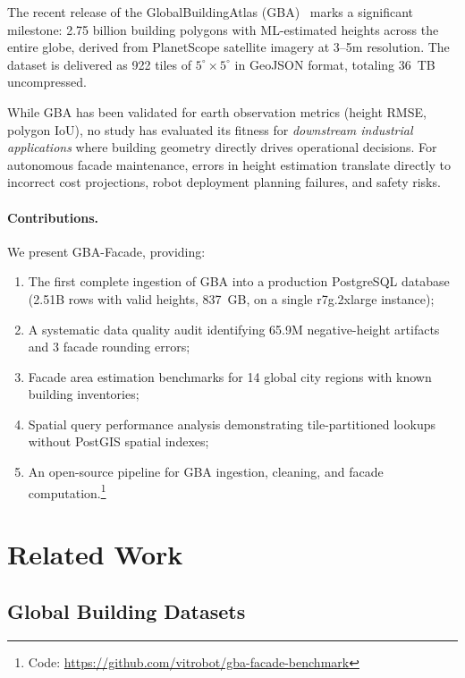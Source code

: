 \documentclass[10pt,twocolumn]{article}
\begin{document}
The recent release of the GlobalBuildingAtlas (GBA)~\citep{zhu2025gba} marks a significant milestone: 2.75 billion building polygons with ML-estimated heights across the entire globe, derived from PlanetScope satellite imagery at 3--5m resolution. The dataset is delivered as 922 tiles of $5^{\circ} \times 5^{\circ}$ in GeoJSON format, totaling 36~TB uncompressed.

While GBA has been validated for earth observation metrics (height RMSE, polygon IoU), no study has evaluated its fitness for \emph{downstream industrial applications} where building geometry directly drives operational decisions. For autonomous facade maintenance, errors in height estimation translate directly to incorrect cost projections, robot deployment planning failures, and safety risks.

\paragraph{Contributions.} We present GBA-Facade, providing:
\begin{enumerate}
  \item The first complete ingestion of GBA into a production PostgreSQL database (2.51B rows with valid heights, 837~GB, on a single r7g.2xlarge instance);
  \item A systematic data quality audit identifying 65.9M negative-height artifacts and 3 facade rounding errors;
  \item Facade area estimation benchmarks for 14 global city regions with known building inventories;
  \item Spatial query performance analysis demonstrating tile-partitioned lookups without PostGIS spatial indexes;
  \item An open-source pipeline for GBA ingestion, cleaning, and facade computation.\footnote{Code: \url{https://github.com/vitrobot/gba-facade-benchmark}}
\end{enumerate}

\section{Related Work}
\label{sec:related}

\subsection{Global Building Datasets}
\end{document}
